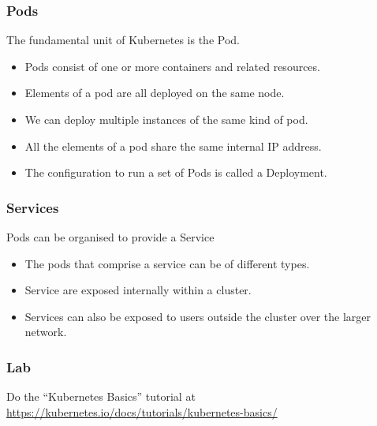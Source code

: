\documentclass[10pt]{beamer}
\begin{document}
\begin{frame}
  \frametitle{Pods}
   
   The fundamental unit of Kubernetes is the Pod.
   \begin{itemize}
        \item Pods consist of one or more containers and related resources.
        \item Elements of a pod are all deployed on the same node.
        \item We can deploy multiple instances of the same kind of pod.
        \item All the elements of a pod share the same internal IP address.
        \item The configuration to run a set of Pods is called a Deployment.
        \end{itemize}
\end{frame}

\begin{frame}
  \frametitle{Services}
   
   Pods can be organised to provide a Service
   \begin{itemize}
       \item The pods that comprise a service can be of different types.
       \item Service are exposed internally within a cluster.
       \item Services can also be exposed to users outside the cluster over the larger network.
     \end{itemize}
\end{frame}


\begin{frame}
  \frametitle{Lab}
   Do the ``Kubernetes Basics'' tutorial at \url{https://kubernetes.io/docs/tutorials/kubernetes-basics/}
   
\end{frame}
\end{document}
